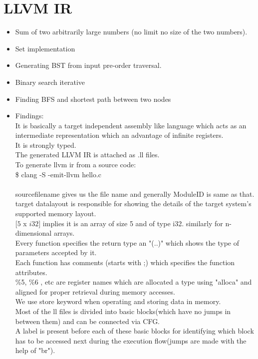 \documentclass[12pt]{article}
\begin{document}
 \newpage

 
\section {LLVM IR}
\begin{itemize}
\item Sum of two arbitrarily large numbers (no limit no size of the two numbers).
\item Set implementation
\item Generating BST from input pre-order traversal.
\item Binary search iterative
\item Finding BFS and shortest path between two nodes
\item Findings:\\
It is basically a target independent assembly like language which acts as an intermediate representation which an advantage of infinite registers.\\
It is strongly typed.\\
The generated LLVM IR is attached as .ll files.\\
To generate llvm ir from a source code:\\
  \$ clang -S -emit-llvm hello.c\\
\\
source\textunderscore filename gives us the file name and generally ModuleID is same as that.\\
target datalayout is responsible for showing the details of the target system's supported memory layout.\\
$[5$ x $i32]$ implies it is an array of size 5 and of type i32. similarly for n-dimensional arrays.\\
Every function specifies the return type an "(..)" which shows the type of parameters accepted by it.\\
Each function has comments (starts with ;) which specifies the function attributes.\\
\%5, \%6 , etc are register names which are allocated a type using "alloca" and aligned for proper retrieval during memory accesses.\\
We use store keyword when operating and storing data in memory.\\
Most of the ll files is divided into basic blocks(which have no jumps in between them) and can be connected via CFG.\\
A label is present before each of these basic blocks for identifying which block has to be accessed next during the execution flow(jumps are made with the help of "br").\\

\end{itemize}
\end{document}
